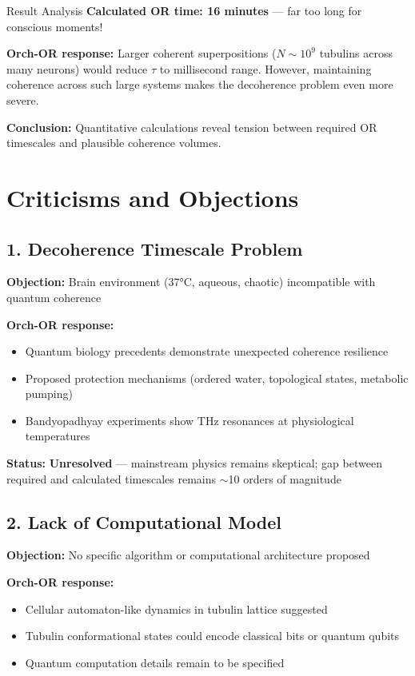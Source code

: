 \begin{calloutbox}[colback=blue!5!white,colframe=blue!75!black]{Result Analysis}
\textbf{Calculated OR time: 16 minutes} --- far too long for conscious moments!

\textbf{Orch-OR response:} Larger coherent superpositions ($N \sim 10^9$ tubulins across many neurons) would reduce $\tau$ to millisecond range. However, maintaining coherence across such large systems makes the decoherence problem even more severe.

\textbf{Conclusion:} Quantitative calculations reveal tension between required OR timescales and plausible coherence volumes.
\end{calloutbox}

\section{Criticisms and Objections}

\subsection{1. Decoherence Timescale Problem}

\textbf{Objection:} Brain environment (37°C, aqueous, chaotic) incompatible with quantum coherence

\textbf{Orch-OR response:}
\begin{itemize}
\item Quantum biology precedents demonstrate unexpected coherence resilience
\item Proposed protection mechanisms (ordered water, topological states, metabolic pumping)
\item Bandyopadhyay experiments show THz resonances at physiological temperatures
\end{itemize}

\textbf{Status:} \textbf{Unresolved} --- mainstream physics remains skeptical; gap between required and calculated timescales remains $\sim$10 orders of magnitude

\subsection{2. Lack of Computational Model}

\textbf{Objection:} No specific algorithm or computational architecture proposed

\textbf{Orch-OR response:}
\begin{itemize}
\item Cellular automaton-like dynamics in tubulin lattice suggested
\item Tubulin conformational states could encode classical bits or quantum qubits
\item Quantum computation details remain to be specified
\end{itemize}


